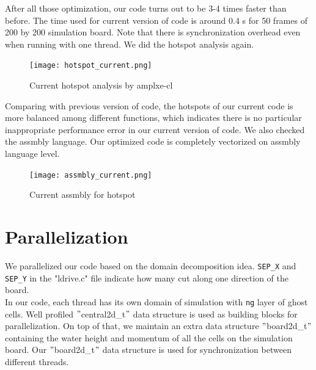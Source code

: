 \documentclass[11pt]{article}
\begin{document}
        After all those optimization, our code turns out to be 3-4 times faster than before. The time used for current 
        version of code is around 0.4 s for 50 frames of 200 by 200 simulation board. Note that there is synchronization
        overhead even when running with one thread. We did the hotspot analysis again.
        
        \begin{figure}[H]
            \centering
            \texttt{[image: hotspot\_current.png]}
            \caption{Current hotspot analysis by amplxe-cl}
        \end{figure}
       
        Comparing with previous version of code, the hotspots of our current code is more balanced among different
        functions, which indicates there is no particular inappropriate performance error in our current version of
        code. We also checked the assmbly language. Our optimized code is completely vectorized on assmbly language level.
        
        \begin{figure}[H]
            \centering
            \texttt{[image: assmbly\_current.png]}
            \caption{Current assmbly for hotspot}
        \end{figure}



        \section{Parallelization}
        We parallelized our code based on the domain decomposition idea. \texttt{SEP\_X} and \texttt{SEP\_Y} in the
        "ldrive.c" file indicate how many cut along one direction of the board. \\

        In our code, each thread has its own domain of simulation with \texttt{ng} layer of ghost cells.
        Well profiled $"$central2d\_t$"$ data structure is used as building blocks for parallelization.
        On top of that, we maintain an extra data structure $"$board2d\_t$"$ containing the water height and momentum
        of all the cells on the simulation board. Our $"$board2d\_t$"$ data structure is used for synchronization
        between different threads. \\
        
\end{document}
